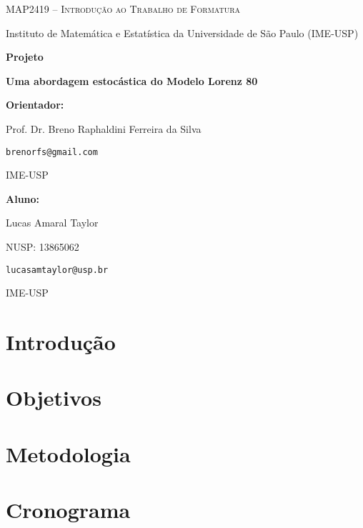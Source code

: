\documentclass[12pt]{article}
\begin{document}
\begin{titlepage}
    \centering
    {\Large\scshape MAP2419 -- Introdução ao Trabalho de Formatura \par}
    \vspace{0.3cm}
    {\large Instituto de Matemática e Estatística da Universidade de São Paulo (IME-USP)\par}
    
    \vspace{3cm}
    
    {\LARGE\bfseries Projeto\par}
    \vspace{1cm}
    {\LARGE\bfseries Uma abordagem estocástica do Modelo Lorenz 80\par}
    
    \vfill
    
    \begin{minipage}[t]{0.45\textwidth}
        \raggedright
        \textbf{Orientador:} \par
        Prof. Dr. Breno Raphaldini Ferreira da Silva \par
        \texttt{brenorfs@gmail.com} \par
        IME-USP
    \end{minipage}
    \hfill
    \begin{minipage}[t]{0.45\textwidth}
        \raggedright
        \textbf{Aluno:} \par
        Lucas Amaral Taylor \par
        NUSP: 13865062 \par
        \texttt{lucasamtaylor@usp.br} \par
        IME-USP
    \end{minipage}
    
    \vspace{2cm}
\end{titlepage}

\section*{Introdução}
\lipsum[1-2]

\section*{Objetivos}
\lipsum[1-2]

\section*{Metodologia}
\lipsum[1-2]

\section*{Cronograma}
\lipsum[1-2]

\nocite{*}
\printbibliography[heading=none]
\end{document}

